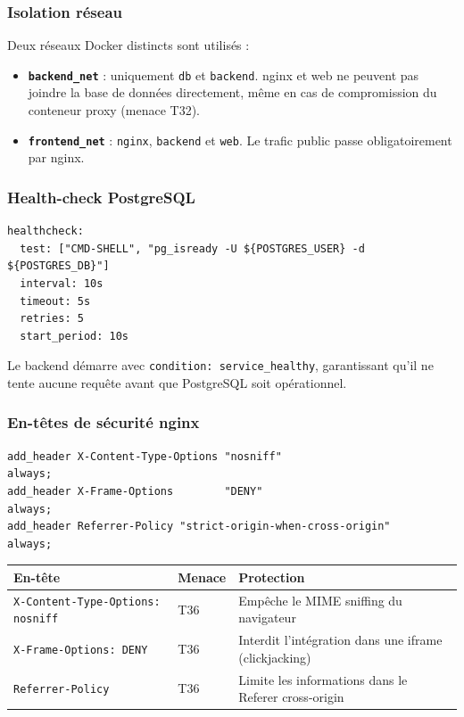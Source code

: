 \documentclass[11pt,a4paper]{article}
\begin{document}
\subsubsection*{Isolation réseau}

Deux réseaux Docker distincts sont utilisés :

\begin{itemize}
  \item \textbf{\texttt{backend\_net}} : uniquement \texttt{db} et \texttt{backend}.
    nginx et web ne peuvent pas joindre la base de données directement, même en cas
    de compromission du conteneur proxy (menace T32).
  \item \textbf{\texttt{frontend\_net}} : \texttt{nginx}, \texttt{backend} et \texttt{web}.
    Le trafic public passe obligatoirement par nginx.
\end{itemize}

\subsubsection*{Health-check PostgreSQL}

\begin{lstlisting}[caption={Health-check du service db dans docker-compose.yml}]
healthcheck:
  test: ["CMD-SHELL", "pg_isready -U ${POSTGRES_USER} -d ${POSTGRES_DB}"]
  interval: 10s
  timeout: 5s
  retries: 5
  start_period: 10s
\end{lstlisting}

Le backend démarre avec \texttt{condition: service\_healthy}, garantissant qu'il ne tente
aucune requête avant que PostgreSQL soit opérationnel.

\subsubsection*{En-têtes de sécurité nginx}

\begin{lstlisting}[caption={infra/nginx/nginx.conf --- en-têtes de sécurité HTTP}]
add_header X-Content-Type-Options "nosniff"                     always;
add_header X-Frame-Options        "DENY"                        always;
add_header Referrer-Policy "strict-origin-when-cross-origin"    always;
\end{lstlisting}

\begin{center}
\renewcommand{\arraystretch}{1.3}
\begin{tabular}{p{5cm}p{3cm}p{5.5cm}}
  \toprule
  \textbf{En-tête} & \textbf{Menace} & \textbf{Protection} \\
  \midrule
  \texttt{X-Content-Type-Options: nosniff} & T36 &
    Empêche le MIME sniffing du navigateur \\
  \texttt{X-Frame-Options: DENY} & T36 &
    Interdit l'intégration dans une iframe (clickjacking) \\
  \texttt{Referrer-Policy} & T36 &
    Limite les informations dans le Referer cross-origin \\
  \bottomrule
\end{tabular}
\end{center}
\end{document}
